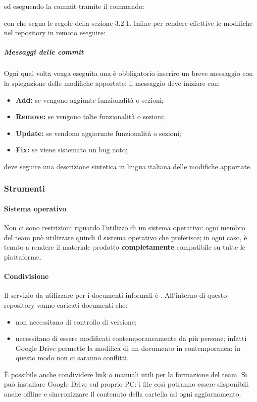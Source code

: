 		ed eseguendo la commit tramite il commando:
		\begin{center}
		\end{center}
		con  che segua le regole della sezione 3.2.1.
		Infine per rendere effettive le modifiche nel repository in remoto eseguire:
		\begin{center}
		\end{center}
		\subparagraph{Messaggi delle commit}
		Ogni qual volta venga eseguita una  è obbligatorio inserire un breve messaggio con la spiegazione
		delle modifiche apportate; il messaggio deve iniziare con:
		\begin{itemize}
			\item \textbf{Add:} se vengono aggiunte funzionalità o sezioni;
			\item \textbf{Remove:} se vengono tolte funzionalità o sezioni;
			\item \textbf{Update:} se vendono aggiornate funzionalità o sezioni;
			\item \textbf{Fix:} se viene sistemato un bug noto;
		\end{itemize}
		deve seguire una descrizione sintetica in lingua italiana delle modifiche apportate.
\subsubsection{Strumenti}
	\paragraph{Sistema operativo}
	Non ci sono restrizioni riguardo l'utilizzo di un sistema operativo: ogni membro del team può utilizzare quindi il sistema operativo che preferisce; in ogni caso, è tenuto a rendere il materiale prodotto \textbf{completamente} compatibile su tutte le piattaforme.
	\paragraph{Condivisione}
	Il servizio da utilizzare per i documenti informali è .
	All'interno di questo repository vanno caricati documenti che:
	\begin{itemize}
		\item non necessitano di controllo di versione;
		\item necessitano di essere modificati contemporaneamente da più persone; infatti Google Drive permette la modifica di un documento in contemporanea: in questo modo non ci saranno conflitti.
	\end{itemize}
	È possibile anche condividere link o manuali utili per la formazione del team. Si può installare Google Drive sul proprio PC: i file così potranno essere disponibili anche offline e sincronizzare il contenuto della cartella ad ogni aggiornamento.
